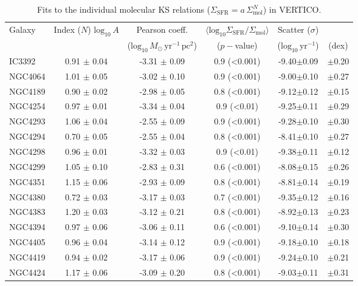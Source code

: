 \documentclass[longauth]{aa}
\begin{document}
\begin{table*}
\centering
\caption{Fits to the individual molecular KS relations ($\Sigma_\textrm{SFR}=a\,\Sigma_\textrm{mol}^N$) in VERTICO.}
\begin{tabular}{lccccc}
\hline
\hline
Galaxy & Index ($N$) $\mathrm{log}_{10}\,A$ & Pearson coeff. & $\langle\mathrm{log}_{10} \Sigma_\mathrm{SFR}/\Sigma_\mathrm{mol}\rangle$ & Scatter ($\sigma$) \\
 & & ($\mathrm{log}_{10}\, M_\odot\,\mathrm{yr}^{-1}\,\mathrm{pc}^{2}$) & ($p-$value) & ($\mathrm{log}_{10}\, \mathrm{yr}^{-1}$) & (dex) \\
\hline
IC3392 & 0.91 $\pm$ 0.04 & -3.31 $\pm$ 0.09 & 0.9 (<0.001) & -9.40$\pm$0.09 & $\pm$0.20 \\ 
NGC4064 & 1.01 $\pm$ 0.05 & -3.02 $\pm$ 0.10 & 0.9 (<0.001) & -9.00$\pm$0.10 & $\pm$0.27\\ 
NGC4189 & 0.90 $\pm$ 0.02 & -2.98 $\pm$ 0.05 & 0.8 (<0.001) & -9.12$\pm$0.12 & $\pm$0.15\\ 
NGC4254 & 0.97 $\pm$ 0.01 & -3.34 $\pm$ 0.04 & 0.9 (<0.01) & -9.25$\pm$0.11 & $\pm$0.29\\ 
NGC4293 & 1.06 $\pm$ 0.04 & -2.55 $\pm$ 0.09 & 0.9 (<0.001) & -9.28$\pm$0.10 & $\pm$0.30\\ 
NGC4294 & 0.70 $\pm$ 0.05 & -2.55 $\pm$ 0.04 & 0.8 (<0.001) & -8.41$\pm$0.10 & $\pm$0.27\\ 
NGC4298 & 0.96 $\pm$ 0.01 & -3.32 $\pm$ 0.03 & 0.9 (<0.01) & -9.38$\pm$0.11 & $\pm$0.12\\ 
NGC4299 & 1.05 $\pm$ 0.10 & -2.83 $\pm$ 0.31 & 0.6 (<0.001) & -8.08$\pm$0.15 & $\pm$0.26\\ 
NGC4351 & 1.15 $\pm$ 0.06 & -2.93 $\pm$ 0.09 & 0.8 (<0.001) & -8.81$\pm$0.14 & $\pm$0.19\\ 
NGC4380 & 0.72 $\pm$ 0.03 & -3.17 $\pm$ 0.03 & 0.7 (<0.001) & -9.35$\pm$0.12 & $\pm$0.16\\ 
NGC4383 & 1.20 $\pm$ 0.03 & -3.12 $\pm$ 0.21 & 0.8 (<0.001) & -8.92$\pm$0.13 & $\pm$0.23\\ 
NGC4394 & 0.97 $\pm$ 0.06 & -3.06 $\pm$ 0.11 & 0.6 (<0.001) & -9.10$\pm$0.14 & $\pm$0.30\\ 
NGC4405 & 0.96 $\pm$ 0.04 & -3.14 $\pm$ 0.12 & 0.9 (<0.001) & -9.18$\pm$0.10 & $\pm$0.18\\ 
NGC4419 & 0.94 $\pm$ 0.02 & -3.17 $\pm$ 0.06 & 0.9 (<0.001) & -9.24$\pm$0.10 & $\pm$0.21\\ 
NGC4424 & 1.17 $\pm$ 0.06 & -3.09 $\pm$ 0.20 & 0.8 (<0.001) & -9.03$\pm$0.11 & $\pm$0.31\\ 

\end{tabular}
\end{table*}
\end{document}
